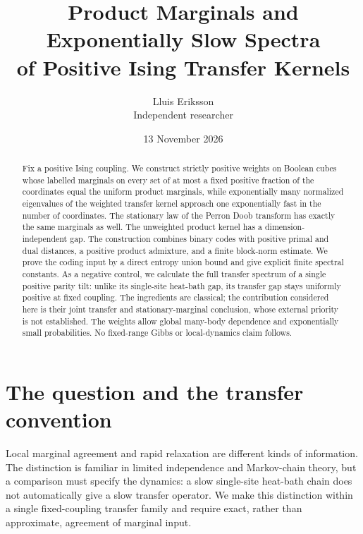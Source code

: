 \documentclass[11pt]{article}
\title{Product Marginals and Exponentially Slow Spectra\\of Positive Ising Transfer Kernels}
\author{Lluis Eriksson\\\small Independent researcher}
\date{13 November 2026}
\begin{document}
\maketitle
\begin{abstract}
Fix a positive Ising coupling. We construct strictly positive weights on
Boolean cubes whose labelled marginals on every set of at most a fixed
positive fraction of the coordinates equal the uniform product marginals,
while exponentially many normalized eigenvalues of the weighted transfer
kernel approach one exponentially fast in the number of coordinates.
The stationary law of the Perron Doob transform has exactly the same
marginals as well. The unweighted product kernel has a dimension-independent
gap. The construction combines binary codes with positive primal and dual
distances, a positive product admixture, and a finite block-norm estimate.
We prove the coding input by a direct entropy union bound and give explicit
finite spectral constants. As a negative control, we calculate the full
transfer spectrum of a single positive parity tilt: unlike its single-site
heat-bath gap, its transfer gap stays uniformly positive at fixed coupling.
The ingredients are classical; the contribution considered here is their
joint transfer and stationary-marginal conclusion, whose external priority
is not established. The weights allow global many-body dependence and
exponentially small probabilities. No fixed-range Gibbs or local-dynamics
claim follows.
\end{abstract}

\section{The question and the transfer convention}
Local marginal agreement and rapid relaxation are different kinds of
information. The distinction is familiar in limited independence and
Markov-chain theory, but a comparison must specify the dynamics: a slow
single-site heat-bath chain does not automatically give a slow transfer
operator. We make this distinction within a single fixed-coupling transfer
family and require exact, rather than approximate, agreement of marginal
input.
\end{document}
